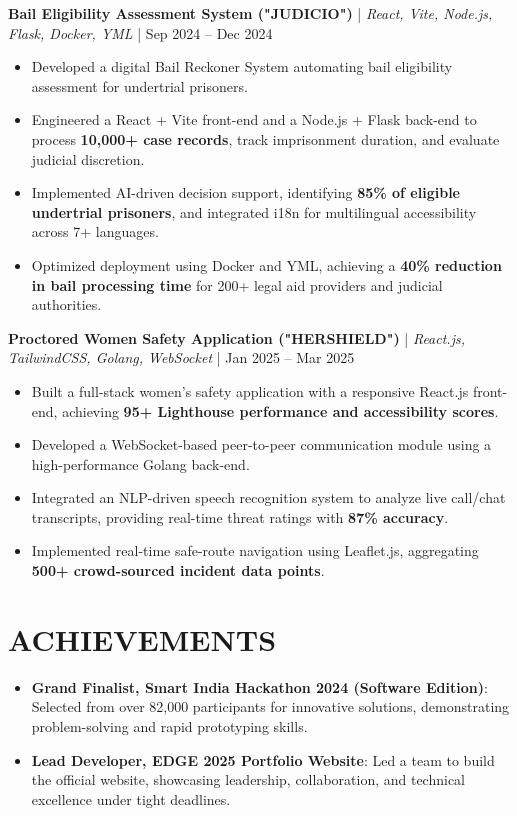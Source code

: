 \documentclass{article}
\begin{document}
\textbf{Bail Eligibility Assessment System ("JUDICIO")} | \textit{React, Vite, Node.js, Flask, Docker, YML} | Sep 2024 – Dec 2024
\begin{itemize}[leftmargin=*]
    \item Developed a digital Bail Reckoner System automating bail eligibility assessment for undertrial prisoners.
    \item Engineered a React + Vite front-end and a Node.js + Flask back-end to process \textbf{10,000+ case records}, track imprisonment duration, and evaluate judicial discretion.
    \item Implemented AI-driven decision support, identifying \textbf{85\% of eligible undertrial prisoners}, and integrated i18n for multilingual accessibility across 7+ languages.
    \item Optimized deployment using Docker and YML, achieving a \textbf{40\% reduction in bail processing time} for 200+ legal aid providers and judicial authorities.
\end{itemize}

\textbf{Proctored Women Safety Application ("HERSHIELD")} | \textit{React.js, TailwindCSS, Golang, WebSocket} | Jan 2025 – Mar 2025
\begin{itemize}[leftmargin=*]
    \item Built a full-stack women's safety application with a responsive React.js front-end, achieving \textbf{95+ Lighthouse performance and accessibility scores}.
    \item Developed a WebSocket-based peer-to-peer communication module using a high-performance Golang back-end.
    \item Integrated an NLP-driven speech recognition system to analyze live call/chat transcripts, providing real-time threat ratings with \textbf{87\% accuracy}.
    \item Implemented real-time safe-route navigation using Leaflet.js, aggregating \textbf{500+ crowd-sourced incident data points}.
\end{itemize}

\section*{ACHIEVEMENTS}

\begin{itemize}[leftmargin=*]
    \item \textbf{Grand Finalist, Smart India Hackathon 2024 (Software Edition)}: Selected from over 82,000 participants for innovative solutions, demonstrating problem-solving and rapid prototyping skills.
    \item \textbf{Lead Developer, EDGE 2025 Portfolio Website}: Led a team to build the official website, showcasing leadership, collaboration, and technical excellence under tight deadlines.
\end{itemize}
\end{document}
